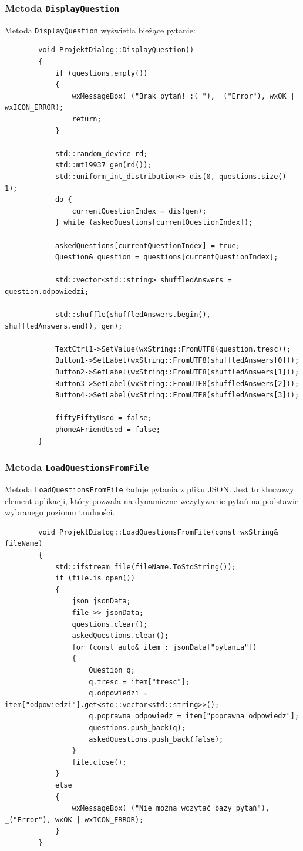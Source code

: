 \documentclass[]{article}
\begin{document}
	\subsubsection{Metoda \texttt{DisplayQuestion}}
	
	Metoda \texttt{DisplayQuestion} wyświetla bieżące pytanie:
	
	\begin{verbatim}
		void ProjektDialog::DisplayQuestion()
		{
			if (questions.empty())
			{
				wxMessageBox(_("Brak pytań! :( "), _("Error"), wxOK | wxICON_ERROR);
				return;
			}
			
			std::random_device rd;
			std::mt19937 gen(rd());
			std::uniform_int_distribution<> dis(0, questions.size() - 1);
			do {
				currentQuestionIndex = dis(gen);
			} while (askedQuestions[currentQuestionIndex]);
			
			askedQuestions[currentQuestionIndex] = true;
			Question& question = questions[currentQuestionIndex];
			
			std::vector<std::string> shuffledAnswers = question.odpowiedzi;
			
			std::shuffle(shuffledAnswers.begin(), shuffledAnswers.end(), gen);
			
			TextCtrl1->SetValue(wxString::FromUTF8(question.tresc));
			Button1->SetLabel(wxString::FromUTF8(shuffledAnswers[0]));
			Button2->SetLabel(wxString::FromUTF8(shuffledAnswers[1]));
			Button3->SetLabel(wxString::FromUTF8(shuffledAnswers[2]));
			Button4->SetLabel(wxString::FromUTF8(shuffledAnswers[3]));
			
			fiftyFiftyUsed = false;
			phoneAFriendUsed = false;
		}
	\end{verbatim}
	
	\subsubsection{Metoda \texttt{LoadQuestionsFromFile}}
	
	Metoda \texttt{LoadQuestionsFromFile} ładuje pytania z pliku JSON. Jest to kluczowy element aplikacji, który pozwala na dynamiczne wczytywanie pytań na podstawie wybranego poziomu trudności.
	
	\begin{verbatim}
		void ProjektDialog::LoadQuestionsFromFile(const wxString& fileName)
		{
			std::ifstream file(fileName.ToStdString());
			if (file.is_open())
			{
				json jsonData;
				file >> jsonData;
				questions.clear();
				askedQuestions.clear();
				for (const auto& item : jsonData["pytania"])
				{
					Question q;
					q.tresc = item["tresc"];
					q.odpowiedzi = item["odpowiedzi"].get<std::vector<std::string>>();
					q.poprawna_odpowiedz = item["poprawna_odpowiedz"];
					questions.push_back(q);
					askedQuestions.push_back(false);
				}
				file.close();
			}
			else
			{
				wxMessageBox(_("Nie można wczytać bazy pytań"), _("Error"), wxOK | wxICON_ERROR);
			}
		}
	\end{verbatim}
	
\end{document}
